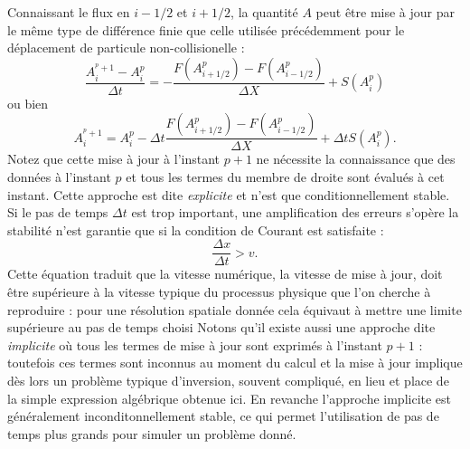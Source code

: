  Connaissant le flux en $i-1/2$ et $i+1/2$, la quantité $A$ peut être mise à jour par le même type de différence finie que celle utilisée précédemment pour le déplacement de particule non-collisionelle :
 \begin{equation}
 \frac{A_i^{^p+1}-A_i^p}{\Delta t}=-\frac{F(A_{i+1/2}^p)-F(A_{i-1/2}^p)}{\Delta X}+S(A_i^p)
 \end{equation}
 ou bien
 \begin{equation}
 A_i^{^p+1}=A_i^p-\Delta t \frac{F(A_{i+1/2}^p)-F(A_{i-1/2}^p)}{\Delta X}+\Delta t S(A_i^p).
 \end{equation}
Notez que cette mise à jour à l'instant $p+1$ ne nécessite la connaissance que des données à l'instant $p$ et tous les termes du membre de droite sont évalués à cet instant. Cette approche est dite \textit{explicite} et n'est que conditionnellement stable. Si le pas de temps $\Delta t$ est trop important, une amplification des erreurs s'opère la stabilité n'est garantie que si la condition de Courant est satisfaite :
\begin{equation}
\frac{\Delta x}{ \Delta t}> v.
\end{equation}
Cette équation traduit que la vitesse numérique, la vitesse de mise à jour, doit être supérieure à la vitesse typique du processus physique que l'on cherche à reproduire : pour une résolution spatiale donnée cela équivaut à mettre une limite supérieure au pas de temps choisi  Notons qu'il existe aussi une approche dite \textit{implicite} où tous les termes de mise à jour sont exprimés à l'instant $p+1$ : toutefois ces termes sont inconnus au moment du calcul et la mise à jour implique dès lors un problème typique d'inversion, souvent compliqué, en lieu et place de la simple expression algébrique obtenue ici. En revanche l'approche implicite est généralement inconditonnellement stable, ce qui permet l'utilisation de pas de temps plus grands pour simuler un problème donné.